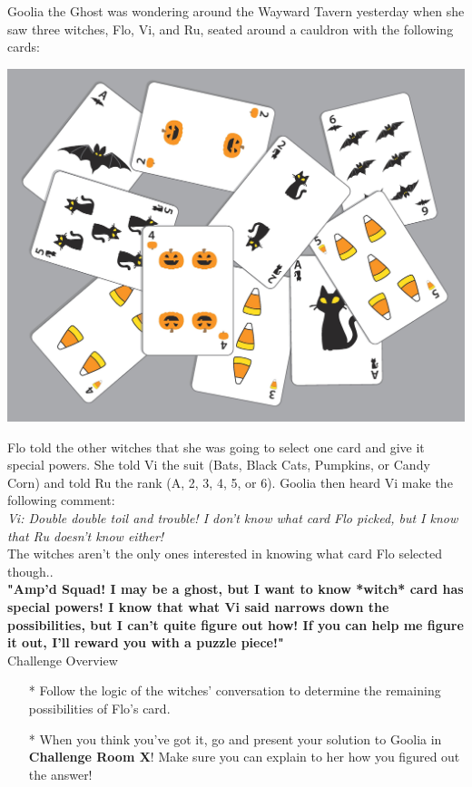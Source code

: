 

Goolia the Ghost was wondering around the Wayward Tavern yesterday when she saw three witches, Flo, Vi, and Ru, seated around a cauldron with the following cards:

    \includegraphics[width=\textwidth]{assets/kat/cardstogeth}

Flo told the other witches that she was going to select one card and give it special powers. She told Vi the suit (Bats, Black Cats, Pumpkins, or Candy Corn) and told Ru the rank (A, 2, 3, 4, 5, or 6). Goolia then heard Vi make the following comment:\\

\textit{Vi: Double double toil and trouble! I don't know what card Flo picked, but I know that Ru doesn't know either!}\\

The witches aren't the only ones interested in knowing what card Flo selected though..\\

\textbf{"Amp'd Squad! I may be a ghost, but I want to know *witch* card has special powers! I know that what Vi said narrows down the possibilities, but I can't quite figure out how! If you can help me figure it out, I'll reward you with a puzzle piece!"}\\


Challenge Overview
\begin{itemize}
\item[*] Follow the logic of the witches' conversation to determine the remaining possibilities of Flo's card.

\item[*] When you think you've got it, go and present your solution to Goolia in \textbf{Challenge Room X}! Make sure you can explain to her how you figured out the answer!
\end{itemize}

